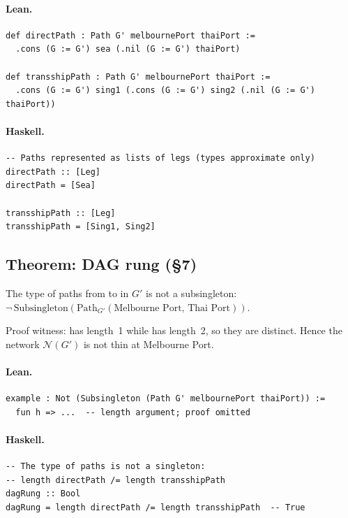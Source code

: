 \documentclass[11pt,a4paper]{article}
\begin{document}
\paragraph{Lean.}
\begin{lstlisting}[style=lean]
def directPath : Path G' melbournePort thaiPort :=
  .cons (G := G') sea (.nil (G := G') thaiPort)

def transshipPath : Path G' melbournePort thaiPort :=
  .cons (G := G') sing1 (.cons (G := G') sing2 (.nil (G := G') thaiPort))
\end{lstlisting}

\paragraph{Haskell.}
\begin{lstlisting}[style=haskell]
-- Paths represented as lists of legs (types approximate only)
directPath :: [Leg]
directPath = [Sea]

transshipPath :: [Leg]
transshipPath = [Sing1, Sing2]
\end{lstlisting}


\subsection{Theorem: DAG rung (\S7)}

\begin{thm}
The type of paths from  to  in $G'$ is not
a subsingleton: $\lnot\,\mathrm{Subsingleton}(\mathrm{Path}_{G'}(\text{Melbourne
Port},\,\text{Thai Port}))$.

Proof witness:  has length~1 while  has
length~2, so they are distinct.  Hence the network $\mathcal{N}(G')$ is not
thin at Melbourne Port.
\end{thm}

\paragraph{Lean.}
\begin{lstlisting}[style=lean]
example : Not (Subsingleton (Path G' melbournePort thaiPort)) :=
  fun h => ...  -- length argument; proof omitted
\end{lstlisting}

\paragraph{Haskell.}
\begin{lstlisting}[style=haskell]
-- The type of paths is not a singleton:
-- length directPath /= length transshipPath
dagRung :: Bool
dagRung = length directPath /= length transshipPath  -- True
\end{lstlisting}
\end{document}
